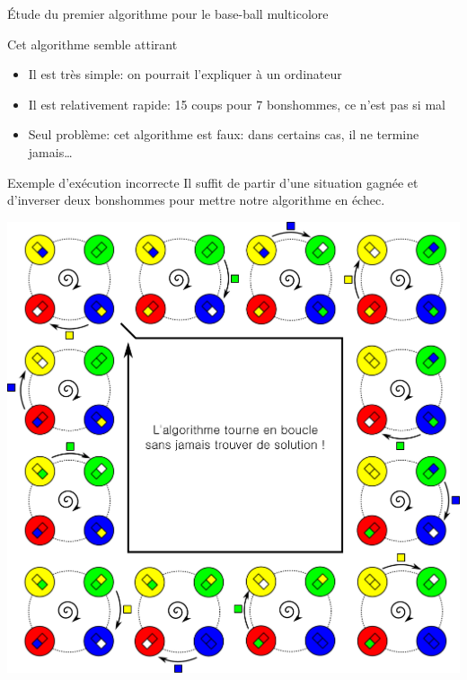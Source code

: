\begin{frame}{Étude du premier algorithme pour le base-ball multicolore}
  \begin{block}{Cet algorithme semble attirant}
    \begin{itemize}
    \item Il est très simple: on pourrait l'expliquer à un ordinateur
    \item Il est relativement rapide: 15 coups pour 7 bonshommes, ce n'est pas si mal
    \item Seul problème: cet algorithme est faux: dans certains cas, il ne termine jamais\ldots
    \end{itemize}
  \end{block}

  \begin{block}{Exemple d'exécution incorrecte}
    Il suffit de partir d'une situation gagnée et d'inverser deux bonshommes pour mettre notre algorithme en échec.
\end{block}
  \begin{center}
    \includegraphics[width=0.8\linewidth]{img/baseball_ex2.pdf}
  \end{center}
\end{frame}

